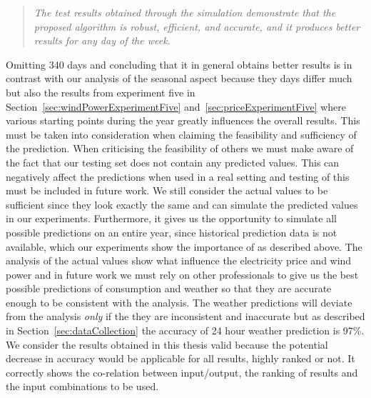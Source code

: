 \begin{quotation}
\textit{The test results obtained through the simulation demonstrate that the proposed algorithm is robust, efficient, and accurate, and it produces better results for any day of the week.}
\end{quotation}

Omitting 340 days and concluding that it in general obtains better results is in contrast with our analysis of the seasonal aspect because they days differ much but also the results from experiment five in Section~\ref{sec:windPowerExperimentFive} and~\ref{sec:priceExperimentFive} where various starting points during the year greatly influences the overall results. This must be taken into consideration when claiming the feasibility and sufficiency of the prediction. When criticising the feasibility of others we must make aware of the fact that our testing set does not contain any predicted values. This can negatively affect the predictions when used in a real setting and testing of this must be included in future work. We still consider the actual values to be sufficient since they look exactly the same and can simulate the predicted values in our experiments. Furthermore, it gives us the opportunity to simulate all possible predictions on an entire year, since historical prediction data is not available, which our experiments show the importance of as described above. The analysis of the actual values show what influence the electricity price and wind power and in future work we must rely on other professionals to give us the best possible predictions of consumption and weather so that they are accurate enough to be consistent with the analysis. The weather predictions will deviate from the analysis \emph{only} if the they are inconsistent and inaccurate but as described in Section~\ref{sec:dataCollection} the accuracy of 24 hour weather prediction is 97\%. We consider the results obtained in this thesis valid because the potential decrease in accuracy would be applicable for all results, highly ranked or not. It correctly shows the co-relation between input/output, the ranking of results and the input combinations to be used.
